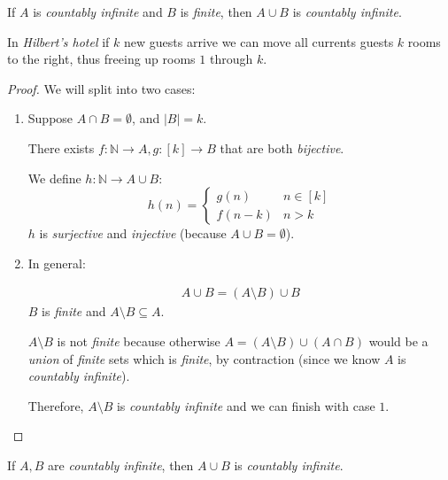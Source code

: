 \documentclass[00_complete]{subfiles}
\begin{document}
\begin{claim}
    If $A$ is \emph{countably infinite} and $B$ is \emph{finite}, then $A\cup
    B$ is \emph{countably infinite}.
\end{claim}
\begin{note}
    In \emph{Hilbert's hotel} if $k$ new guests arrive we can move all currents
    guests $k$ rooms to the right, thus freeing up rooms $1$ through $k$.
\end{note}
\begin{proof}
    We will split into two cases:
    \begin{enumerate}
        \item Suppose $A\cap B = \emptyset$, and $|B|=k$.

        There exists $f:\mathbb{N}\to A, g:[k]\to B$ that are both
        \emph{bijective}.

        We define $h:\mathbb{N}\to A \cup B$:
        $$h(n)=\begin{cases}
            g(n)   & n \in [k] \\
            f(n-k) & n > k
        \end{cases}$$
        $h$ is \emph{surjective} and \emph{injective} (because $A\cup B =
        \emptyset$).
        \item In general:

        \begin{gather*}
            A \cup B = (A \setminus B) \cup B
        \end{gather*}
        $B$ is \emph{finite} and $A \setminus B \subseteq A$.

        $A \setminus B$ is not \emph{finite} because otherwise $A=(A\setminus
        B)\cup(A\cap B)$ would be a \emph{union} of \emph{finite} sets which is
        \emph{finite}, by contraction (since we know $A$ is \emph{countably
        infinite}).

        Therefore, $A \setminus B$ is \emph{countably infinite} and we can
        finish with case $1$.
    \end{enumerate}
\end{proof}
\begin{claim}
    If $A,B$ are \emph{countably infinite}, then $A \cup B$ is \emph{countably
    infinite}.
\end{claim}
\end{document}
